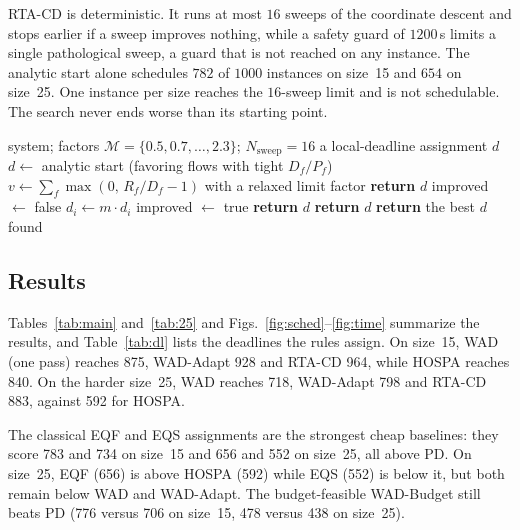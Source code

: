 \documentclass[conference]{IEEEtran}
\begin{document}
RTA-CD is deterministic. It runs at most $16$ sweeps of the coordinate descent
and stops earlier if a sweep improves nothing, while a safety guard of $1200$\,s
limits a single pathological sweep, a guard that is not reached on any instance.
The analytic start alone schedules $782$ of $1000$ instances on size~15 and $654$
on size~25. One instance per size reaches the $16$-sweep limit and is not schedulable.
The search never ends worse than its starting point.

\begin{algorithm}[t]
\caption{RTA-CD (one instance)}
\label{alg:rta}
\begin{algorithmic}[1]
\REQUIRE system; factors $\mathcal{M}=\{0.5,0.7,\dots,2.3\}$; $N_{\mathrm{sweep}}=16$
\ENSURE a local-deadline assignment $d$
\STATE $d \leftarrow$ analytic start (favoring flows with tight $D_f/P_f$)
\STATE $v \leftarrow \sum_f \max(0,\,R_f/D_f-1)$ with a relaxed limit factor
  \STATE \textbf{return} $d$
\ENDIF
{}
  \STATE improved $\leftarrow$ false
        \STATE $d_i \leftarrow m\cdot d_i$
        \STATE improved $\leftarrow$ true
      \ENDIF
    \ENDFOR
  \ENDFOR
   \STATE \textbf{return} $d$ \ENDIF
    \STATE \textbf{return} $d$
  \ENDIF
\ENDFOR
\STATE \textbf{return} the best $d$ found
\end{algorithmic}
\end{algorithm}

\subsection{Results}
Tables~\ref{tab:main} and~\ref{tab:25} and Figs.~\ref{fig:sched}--\ref{fig:time}
summarize the results, and Table~\ref{tab:dl} lists the deadlines the rules
assign. On size~15, WAD (one pass) reaches 875, WAD-Adapt 928 and RTA-CD 964,
while HOSPA reaches 840. On the harder size~25, WAD reaches 718, WAD-Adapt 798 and
RTA-CD 883, against 592 for HOSPA.

The classical EQF and EQS assignments are the strongest cheap baselines:
they score 783 and 734 on size~15 and 656 and 552 on size~25, all above PD. On
size~25, EQF (656) is above HOSPA (592) while EQS (552) is below it, but both
remain below WAD and WAD-Adapt. The budget-feasible WAD-Budget still beats PD (776
versus 706 on size~15, 478 versus 438 on size~25).
\end{document}
